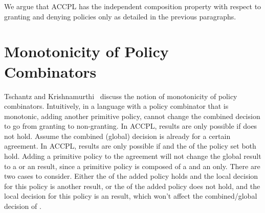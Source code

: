 We argue that \ac{ACCPL} has the independent composition property with respect to granting and denying policies only as detailed in the previous paragraphs. 

\section{Monotonicity of Policy Combinators}

Tschantz and Krishnamurthi~\cite{Tschantz} discuss the notion of monotonicity of policy combinators. Intuitively, in a language with a policy combinator that is monotonic, adding another primitive policy, cannot change the combined decision to go from granting to non-granting. In \ac{ACCPL},  results are only possible if  does not hold. Assume the combined (global) decision is already  for a certain agreement. In \ac{ACCPL},  results are only possible if  and the  of the policy set both hold. Adding a primitive policy to the agreement will not change the global  result to a  or an  result, since a primitive policy is composed of a  and an  only. There are two cases to consider. Either the  of the added policy holds and the local decision for this policy is another  result, or the  of the added policy does not hold, and the local decision for this policy is an  result, which won't affect the combined/global decision of .






